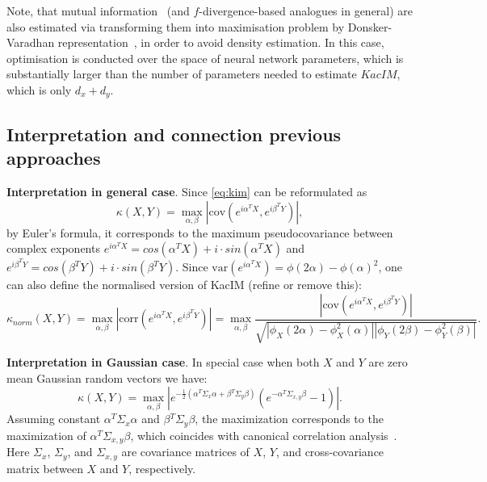 \documentclass{article}
\newcommand{\cov}{\mathrm{cov}}
\newcommand{\corr}{\mathrm{corr}}
\newcommand{\var}{\mathrm{var}}
\begin{document}
Note, that mutual information~\cite{Cover2006} (and $f$-divergence-based analogues in general) are also estimated via transforming them into maximisation problem by Donsker-Varadhan representation~\cite{pmlr-v80-belghazi18a}, in order to avoid density estimation. In this case, optimisation is conducted over the space of neural network parameters, which is substantially larger than the number of parameters needed to estimate $KacIM$, which is only $d_{x} + d_{y}$.

\subsection{Interpretation and connection previous approaches}
\textbf{Interpretation in general case}. Since \eqref{eq:kim} can be reformulated as
\begin{equation}
\kappa(X,Y) = \max_{\alpha,\beta} |\cov(e^{i\alpha^{T}X},e^{i\beta^{T}Y})|,
\end{equation}
by Euler's formula, it corresponds to the maximum pseudocovariance between complex exponents $e^{i\alpha^{T}X} = cos(\alpha^{T}X) + i \cdot sin(\alpha^{T}X)$ and $e^{i\beta^{T}Y} = cos(\beta^{T}Y) + i \cdot sin(\beta^{T}Y)$.
Since $\var(e^{i\alpha^{T}X}) = \phi(2\alpha) - \phi(\alpha)^2$, one can also define the normalised version of KacIM (refine or remove this):
\begin{equation}
\kappa_{norm}(X,Y) = \max_{\alpha,\beta} |\corr(e^{i\alpha^{T}X},e^{i\beta^{T}Y})| = \max_{\alpha,\beta} \frac{|\cov(e^{i\alpha^{T}X},e^{i\beta^{T}Y})|}{\sqrt{|\phi_{X}(2\alpha)-\phi_{X}^{2}(\alpha)||\phi_{Y}(2\beta)-\phi_{Y}^{2}(\beta)|}}.
\end{equation}


\textbf{Interpretation in Gaussian case}. In special case when both $X$ and $Y$ are zero mean Gaussian random vectors we have:
\begin{equation}
\label{eq:gaussian_kacim}
\kappa(X,Y) = \max_{\alpha, \beta} | e^{-\frac{1}{2} (\alpha^{T}\Sigma_{x}\alpha + \beta{^T}\Sigma_{y}\beta)}(e^{-\alpha{^T}\Sigma_{x,y}\beta} - 1)|.
\end{equation}
Assuming constant $\alpha^{T}\Sigma_{x}\alpha$ and  $\beta{^T}\Sigma_{y}\beta$, the maximization corresponds to the maximization of  $\alpha{^T}\Sigma_{x,y}\beta$, which coincides with canonical correlation analysis~\cite{10.5555/3279302}. Here $\Sigma_{x}$, $\Sigma_{y}$, and  $\Sigma_{x,y}$ are covariance matrices of $X$, $Y$, and cross-covariance matrix between $X$ and $Y$, respectively.
\end{document}
